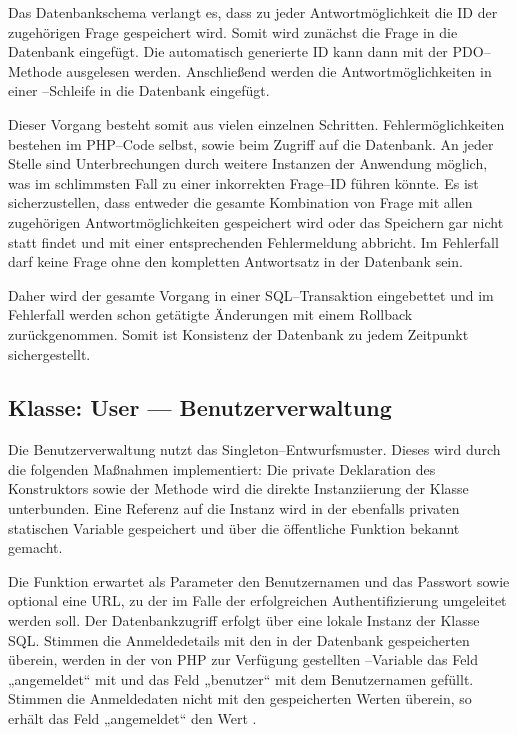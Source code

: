Das Datenbankschema verlangt es, dass zu jeder Antwortmöglichkeit die ID der zugehörigen Frage gespeichert wird. Somit wird zunächst die Frage in die Datenbank eingefügt. Die automatisch generierte ID kann dann mit der PDO--Methode  ausgelesen werden. Anschließend werden die Antwortmöglichkeiten in einer --Schleife in die Datenbank eingefügt.

Dieser Vorgang besteht somit aus vielen einzelnen Schritten. Fehlermöglichkeiten bestehen im PHP--Code selbst, sowie beim Zugriff auf die Datenbank. An jeder Stelle sind Unterbrechungen durch weitere Instanzen der Anwendung möglich, was im schlimmsten Fall zu einer inkorrekten Frage--ID führen könnte. Es ist sicherzustellen, dass entweder die gesamte Kombination von Frage mit allen zugehörigen Antwortmöglichkeiten gespeichert wird oder das Speichern gar nicht statt findet und mit einer entsprechenden Fehlermeldung abbricht. Im Fehlerfall darf keine Frage ohne den kompletten Antwortsatz in der Datenbank sein. 

Daher wird der gesamte Vorgang in einer SQL--Transaktion eingebettet und im Fehlerfall werden schon getätigte Änderungen mit einem Rollback zurückgenommen. Somit ist Konsistenz der Datenbank zu jedem Zeitpunkt sichergestellt.

\subsection{Klasse: User --- Benutzerverwaltung}
\label{sec:user}
Die Benutzerverwaltung nutzt das Singleton--Entwurfsmuster. Dieses wird durch die folgenden Maßnahmen implementiert: Die private Deklaration des Konstruktors sowie der  Methode wird die direkte Instanziierung der Klasse unterbunden. Eine Referenz auf die Instanz wird in der ebenfalls privaten statischen Variable  gespeichert und über die öffentliche Funktion  bekannt gemacht.

Die Funktion  erwartet als Parameter den Benutzernamen und das Passwort sowie optional eine URL, zu der im Falle der erfolgreichen Authentifizierung umgeleitet werden soll. Der Datenbankzugriff erfolgt über eine lokale Instanz der Klasse SQL. Stimmen die Anmeldedetails mit den in der Datenbank gespeicherten überein, werden in der von PHP zur Verfügung gestellten --Variable das Feld „angemeldet“ mit  und das Feld „benutzer“ mit dem Benutzernamen gefüllt. Stimmen die Anmeldedaten nicht mit den gespeicherten Werten überein, so erhält das Feld „angemeldet“ den Wert .

